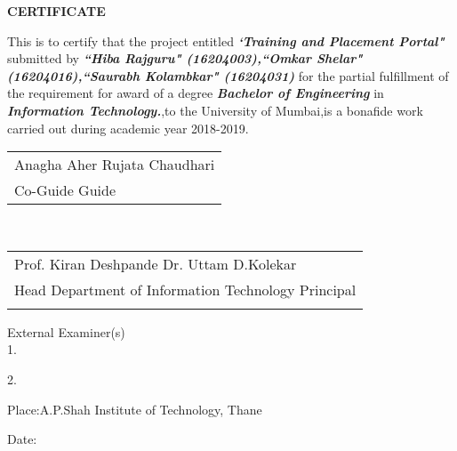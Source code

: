 \newpage
\thispagestyle{empty}
\vspace*{0.2cm}
\vspace{1cm}
\begin{center}
 \large\textbf{CERTIFICATE}
\end{center}
\vspace{1cm}

\par This is to certify that the project entitled \textbf{\textit{`Training and Placement Portal"}} submitted by \textbf{\textit{``Hiba Rajguru" (16204003),``Omkar Shelar" (16204016),``Saurabh Kolambkar" (16204031)}}  for the partial fulfillment of the requirement for award of a degree \textbf{\textit{Bachelor of Engineering} }in\textbf{ \textit{Information Technology.}},to the University of Mumbai,is a bonafide work carried out during academic year 2018-2019.\\

\vspace{30mm}
\begin{tabular}{@{}l@{}}
Anagha Aher\hspace{78mm}       Rujata Chaudhari\\
Co-Guide \hspace{95mm}      Guide\\

\end{tabular}
\vspace{30mm}\\
\hfill
\begin{tabular}{@{}l@{}}
\hspace{5mm} Prof. Kiran Deshpande\hspace{65mm}       Dr. Uttam D.Kolekar\\
\hspace{5mm}Head Department of Information Technology \hspace{40mm} Principal\\
\vspace{5mm}
\end{tabular}

\vspace{20mm}
External Examiner(s)\\

1. \\
\vspace{10mm}

2. \\
\vspace{5mm}

Place:A.P.Shah Institute of Technology, Thane\par
\vspace{1mm}

Date:
\clearpage

\vspace{5mm}


